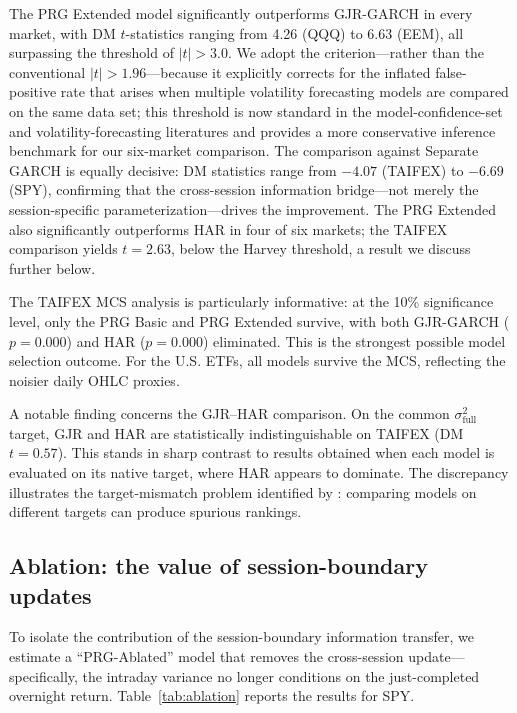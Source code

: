 \documentclass[11pt,a4paper]{article}
\begin{document}
The PRG Extended model significantly outperforms GJR-GARCH in every market, with DM $t$-statistics ranging from 4.26 (QQQ) to 6.63 (EEM), all surpassing the \citet{Harvey2016} threshold of $|t|>3.0$. We adopt the \citet{Harvey2016} criterion---rather than the conventional $|t|>1.96$---because it explicitly corrects for the inflated false-positive rate that arises when multiple volatility forecasting models are compared on the same data set; this threshold is now standard in the model-confidence-set and volatility-forecasting literatures and provides a more conservative inference benchmark for our six-market comparison. The comparison against Separate GARCH is equally decisive: DM statistics range from $-4.07$ (TAIFEX) to $-6.69$ (SPY), confirming that the cross-session information bridge---not merely the session-specific parameterization---drives the improvement. The PRG Extended also significantly outperforms HAR in four of six markets; the TAIFEX comparison yields $t = 2.63$, below the Harvey threshold, a result we discuss further below.

The TAIFEX MCS analysis is particularly informative: at the 10\% significance level, only the PRG Basic and PRG Extended survive, with both GJR-GARCH ($p = 0.000$) and HAR ($p = 0.000$) eliminated. This is the strongest possible model selection outcome. For the U.S. ETFs, all models survive the MCS, reflecting the noisier daily OHLC proxies.

A notable finding concerns the GJR--HAR comparison. On the common $\sigma^2_{\text{full}}$ target, GJR and HAR are statistically indistinguishable on TAIFEX (DM $t = 0.57$). This stands in sharp contrast to results obtained when each model is evaluated on its native target, where HAR appears to dominate. The discrepancy illustrates the target-mismatch problem identified by \citet{Patton2011}: comparing models on different targets can produce spurious rankings.

\subsection{Ablation: the value of session-boundary updates}

To isolate the contribution of the session-boundary information transfer, we estimate a ``PRG-Ablated'' model that removes the cross-session update---specifically, the intraday variance no longer conditions on the just-completed overnight return. Table~\ref{tab:ablation} reports the results for SPY.
\end{document}
